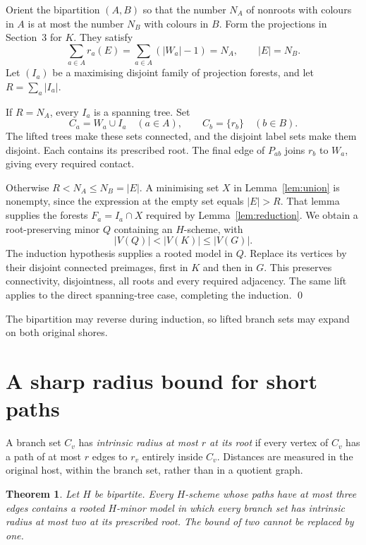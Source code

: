 \documentclass[11pt]{amsart}
\newtheorem{theorem}{Theorem}[section]
\begin{document}
Orient the bipartition $(A,B)$ so that the number $N_A$ of nonroots
with colours in $A$ is at most the number $N_B$ with colours in $B$.
Form the projections in Section~3 for $K$. They satisfy
\[
 \sum_{a\in A}r_a(E)=\sum_{a\in A}(|W_a|-1)=N_A,
 \qquad |E|=N_B.
\]
Let $(I_a)$ be a maximising disjoint family of projection forests,
and let $R=\sum_a|I_a|$.

If $R=N_A$, every $I_a$ is a spanning tree. Set
\[
 C_a=W_a\cup I_a\quad(a\in A),\qquad C_b=\{r_b\}\quad(b\in B).
\]
The lifted trees make these sets connected, and the disjoint label sets
make them disjoint. Each contains its prescribed root. The final edge
of $P_{ab}$
joins $r_b$ to $W_a$, giving every required contact.

Otherwise $R<N_A\leq N_B=|E|$. A minimising set $X$ in
Lemma~\ref{lem:union} is nonempty, since the expression at the empty
set equals $|E|>R$. That lemma supplies the forests $F_a=I_a\cap X$
required by Lemma~\ref{lem:reduction}. We obtain a root-preserving minor
$Q$ containing an $H$-scheme, with
\[
 |V(Q)|<|V(K)|\leq |V(G)|.
\]
The induction hypothesis supplies a rooted model in $Q$. Replace its
vertices by their disjoint connected preimages, first in $K$ and then
in $G$. This preserves connectivity, disjointness, all roots and every
required adjacency. The same lift applies to the direct spanning-tree
case, completing the induction. \qed

The bipartition may reverse during induction, so lifted branch sets
may expand on both original shores.

\section{A sharp radius bound for short paths}\label{sec:radius}

A branch set $C_v$ has \emph{intrinsic radius at most $r$ at its root}
if every vertex of $C_v$ has a path of at most $r$ edges to $r_v$ entirely
inside $C_v$. Distances are measured in the original host, within the
branch set, rather than in a quotient graph.

\begin{theorem}\label{thm:radius}
Let $H$ be bipartite. Every $H$-scheme whose paths have at most three
edges contains a rooted $H$-minor model in which every branch set has
intrinsic radius at most two at its prescribed root. The bound of two
cannot be replaced by one.
\end{theorem}
\end{document}
